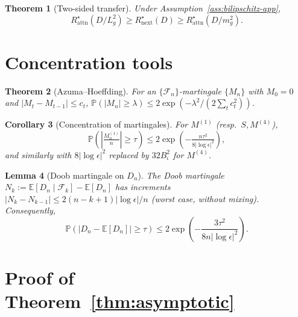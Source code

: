 \documentclass[11pt]{article}
\newcommand{\E}{\mathbb{E}}
\newcommand{\Prob}{\mathbb{P}}
\newcommand{\F}{\mathcal{F}}
\theoremstyle{plain}
\newtheorem{theorem}{Theorem}[section]
\newtheorem{lemma}[theorem]{Lemma}
\newtheorem{corollary}[theorem]{Corollary}
\theoremstyle{definition}
\theoremstyle{remark}
\begin{document}
\begin{theorem}[Two-sided transfer]\label{thm:ffn-invariance-app}
Under Assumption~\ref{ass:bilipschitz-app},
\[
R^\star_{\mathrm{attn}}(D/L_g^2) \geq R^\star_{\mathrm{next}}(D) \geq R^\star_{\mathrm{attn}}(D/m_g^2).
\]
\end{theorem}

\section{Concentration tools}\label{app:concentration}

\begin{theorem}[Azuma--Hoeffding]\label{thm:azuma-app}
For an $\{\F_n\}$-martingale $\{M_n\}$ with $M_0 = 0$ and
$|M_t - M_{t-1}| \leq c_t$,
$\Prob(|M_n| \geq \lambda) \leq 2\exp(-\lambda^2 / (2 \sum_t c_t^2))$.
\end{theorem}

\begin{corollary}[Concentration of martingales]\label{cor:conc-app}
For $M^{(1)}$ (resp.\ $S, M^{(4)}$),
\[
\Prob\!\left( \left| \tfrac{M_n^{(1)}}{n} \right| \geq \tau \right)
\leq 2 \exp\!\left( -\tfrac{n\tau^2}{8 |\log\epsilon|^2} \right),
\]
and similarly with $8|\log\epsilon|^2$ replaced by $32 B_\iota^2$
for $M^{(4)}$.
\end{corollary}

\begin{lemma}[Doob martingale on $D_n$]\label{lem:Dn-doob-app}
The Doob martingale $N_k := \E[D_n \mid \F_k] - \E[D_n]$ has
increments $|N_k - N_{k-1}| \leq 2(n-k+1)|\log\epsilon|/n$
(worst case, without mixing). Consequently,
\[
\Prob(|D_n - \E[D_n]| \geq \tau) \leq 2\exp\!\left( -\frac{3\tau^2}{8 n |\log\epsilon|^2} \right).
\]
\end{lemma}

\section{Proof of Theorem~\ref{thm:asymptotic}}\label{app:thm-asym}
\end{document}
